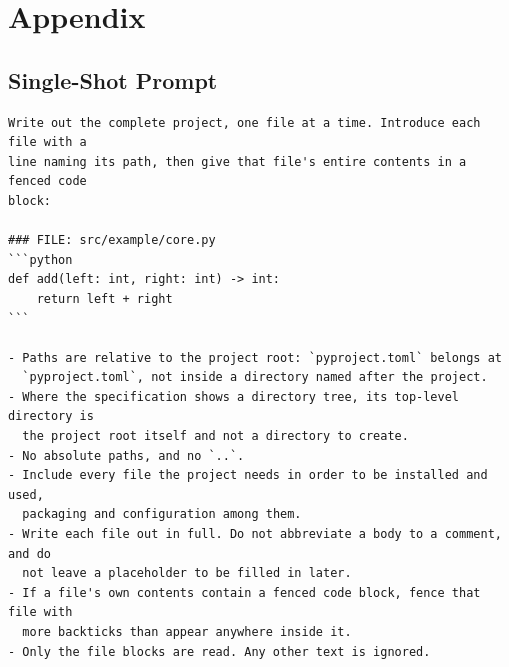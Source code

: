 %
\chapter{Appendix}\label{sec:appendix}


\section{Single-Shot Prompt}\label{sec:appendix:single-shot-prompt}

\begin{lstlisting}[style=promptstyle,
                   caption={Ausgabeprotokoll der Single-Shot-Solution
                            (Python-Konstante \texttt{FORMAT\_INSTRUCTION});
                            wird der Task-Beschreibung unverändert angehängt.},
                   label={lst:prompt-singleshot}]
Write out the complete project, one file at a time. Introduce each file with a
line naming its path, then give that file's entire contents in a fenced code
block:

### FILE: src/example/core.py
```python
def add(left: int, right: int) -> int:
    return left + right
```

- Paths are relative to the project root: `pyproject.toml` belongs at
  `pyproject.toml`, not inside a directory named after the project.
- Where the specification shows a directory tree, its top-level directory is
  the project root itself and not a directory to create.
- No absolute paths, and no `..`.
- Include every file the project needs in order to be installed and used,
  packaging and configuration among them.
- Write each file out in full. Do not abbreviate a body to a comment, and do
  not leave a placeholder to be filled in later.
- If a file's own contents contain a fenced code block, fence that file with
  more backticks than appear anywhere inside it.
- Only the file blocks are read. Any other text is ignored.
\end{lstlisting}